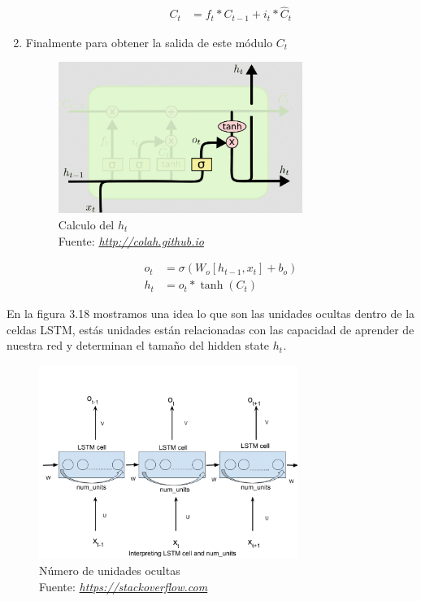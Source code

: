 \begin{enumerate}
\begin{enumerate}
\begin{equation}
\begin{aligned}
				C_{t}&=f_{t}\ast C_{t-1} + i_{t}\ast \hat{C}_{t}
		    \end{aligned}
		\end{equation}
	\end{enumerate}
\item Finalmente para obtener la salida de este módulo $C_{t}$
		\begin{figure}[H]
	\centering
	\includegraphics[width=0.75\textwidth]{Figures/LSTM9.png}
	\caption{Calculo del $h_{t}$ \\ Fuente:  \href{http://colah.github.io/posts/2015-08-Understanding-LSTMs/}{\textit{http://colah.github.io}}}
	\label{}
\end{figure}
		\begin{equation}
			\label{ht}
			\begin{aligned}
				o_{t}&=\sigma(W_{o}[h_{t-1},x_{t}]+b_{o})\\
				h_{t}&=o_{t}\ast \tanh(C_{t})
			\end{aligned}
		\end{equation}
\end{enumerate}
En la figura 3.18 mostramos una idea lo que son las unidades ocultas dentro de la celdas LSTM, estás unidades están relacionadas con las capacidad de aprender de nuestra red y determinan el tamaño del hidden state $h_{t}$.

\begin{figure}[H]
	\centering
	\includegraphics[width=0.75\textwidth]{Figures/hunits.png}
	\caption{Número de unidades ocultas\\ Fuente:  \href{https://stackoverflow.com/questions/37901047/what-is-num-units-in-tensorflow-basiclstmcell}{\textit{https://stackoverflow.com}}}
	\label{}
\end{figure}

